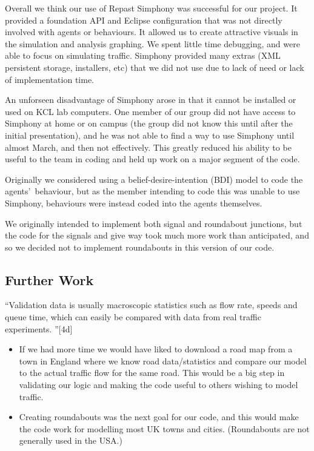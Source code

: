 \documentclass[11pt]{article}
\begin{document}
\begin{enumerate}
Overall we think our use of Repast Simphony was successful for our project. It provided a foundation API and Eclipse configuration that was not directly involved with agents or behaviours. It allowed us to create attractive visuals in the simulation and analysis graphing. We spent little time debugging, and were able to focus on simulating traffic. Simphony provided many extras (XML persistent storage, installers, etc) that we did not use due to lack of need or lack of implementation time.

An unforseen disadvantage of Simphony arose in that it cannot be installed or used on KCL lab computers. One member of our group did not have access to Simphony at home or on campus (the group did not know this until after the initial presentation), and he was not able to find a way to use Simphony until almost March, and then not effectively. This greatly reduced his ability to be useful to the team in coding and held up work on a major segment of the code.

Originally we considered using a belief-desire-intention (BDI) model to code the agents\textquoteright\ behaviour, but as the member intending to code this was unable to use Simphony, behaviours were instead coded into the agents themselves.

We originally intended to implement both signal and roundabout junctions, but the code for the signals and give way took much more work than anticipated, and so we decided not to implement roundabouts in this version of our code.
\\

\subsection{Further Work}

\textquotedblleft Validation data is usually macroscopic statistics such as flow rate, speeds and queue time, which can easily be compared with data from real traffic experiments. \textquotedblright [4d] 

\begin{itemize}\itemsep0pt
\item If we had more time we would have liked to download a road map from a town in England where we know road data/statistics and compare our model to the actual traffic flow for the same road. This would be a big step in validating our logic and making the code useful to others wishing to model traffic.

\item  Creating roundabouts was the next goal for our code, and this would make the code work for modelling most UK towns and cities. (Roundabouts are not generally used in the USA.)


\end{itemize}
\end{enumerate}
\end{document}
